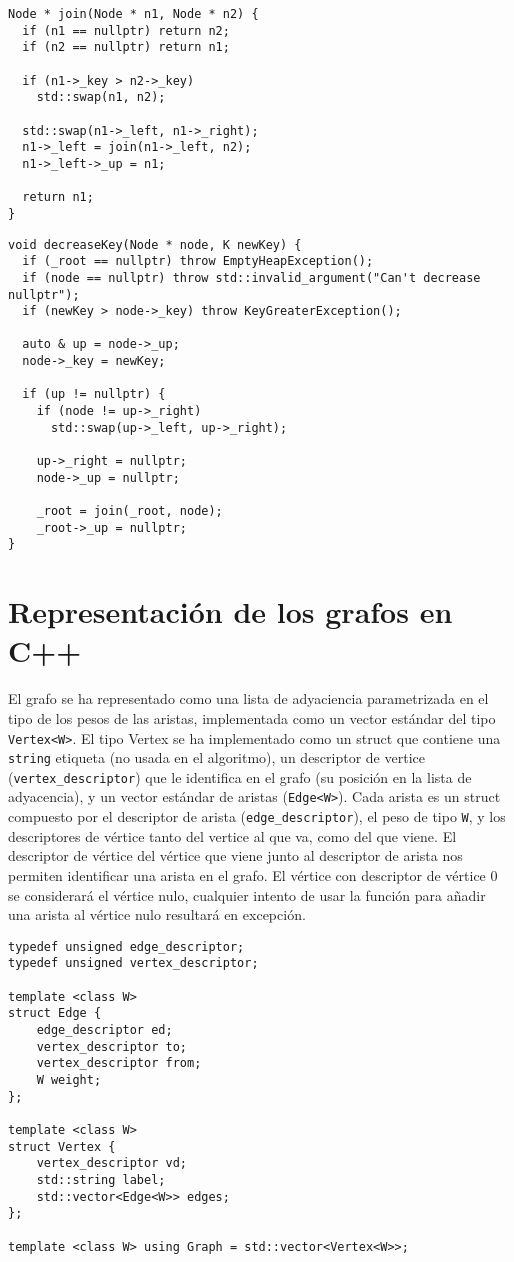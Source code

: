 \documentclass{article}
\begin{document}
\begin{verbatim}
Node * join(Node * n1, Node * n2) {
  if (n1 == nullptr) return n2;
  if (n2 == nullptr) return n1;

  if (n1->_key > n2->_key)
	std::swap(n1, n2);

  std::swap(n1->_left, n1->_right);
  n1->_left = join(n1->_left, n2);
  n1->_left->_up = n1;

  return n1;
}
\end{verbatim}
\begin{verbatim}
void decreaseKey(Node * node, K newKey) {
  if (_root == nullptr) throw EmptyHeapException();
  if (node == nullptr) throw std::invalid_argument("Can't decrease nullptr");
  if (newKey > node->_key) throw KeyGreaterException();

  auto & up = node->_up;
  node->_key = newKey;

  if (up != nullptr) {
	if (node != up->_right)
	  std::swap(up->_left, up->_right);

	up->_right = nullptr;
	node->_up = nullptr;

	_root = join(_root, node);
	_root->_up = nullptr;
}
\end{verbatim}

\section{Representación de los grafos en C++}
El grafo se ha representado como una lista de adyaciencia parametrizada
en el tipo de los pesos de las aristas, implementada como un vector estándar del 
tipo \texttt{Vertex<W>}. El tipo Vertex se ha implementado como un struct que
contiene una \texttt{string} etiqueta (no usada en el algoritmo), un descriptor de
vertice (\texttt{vertex\_descriptor}) que le identifica en el grafo (su posición en
la lista de adyacencia), y un vector estándar de aristas (\texttt{Edge<W>}). Cada arista es un struct compuesto por el descriptor de arista (\texttt{edge\_descriptor}), el peso de tipo \texttt{W}, y los descriptores de vértice tanto del vertice al que va, como del que viene. El descriptor de vértice del vértice que viene junto al descriptor de arista nos permiten identificar una arista en el grafo. El vértice con descriptor de vértice 0 se considerará el vértice nulo, cualquier intento de usar la función para añadir una arista al vértice nulo resultará en excepción.
\begin{verbatim}
typedef unsigned edge_descriptor;
typedef unsigned vertex_descriptor;

template <class W> 
struct Edge {
    edge_descriptor ed;
    vertex_descriptor to;
    vertex_descriptor from;
    W weight;
};

template <class W>
struct Vertex {
    vertex_descriptor vd;
    std::string label;
    std::vector<Edge<W>> edges;
};

template <class W> using Graph = std::vector<Vertex<W>>;
\end{verbatim}
\end{document}
